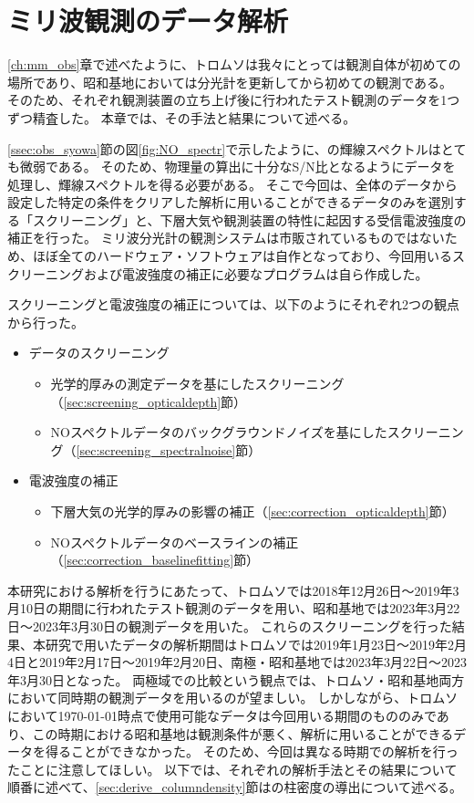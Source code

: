 \chapter{ミリ波観測のデータ解析}
\label{ch:mm_analysis}
\ref{ch:mm_obs}章で述べたように、トロムソは我々にとっては観測自体が初めての場所であり、昭和基地においては分光計を更新してから初めての観測である。
そのため、それぞれ観測装置の立ち上げ後に行われたテスト観測のデータを1つずつ精査した。
本章では、その手法と結果について述べる。\par

\ref{ssec:obs_syowa}節の図\ref{fig:NO_spectr}で示したように、の輝線スペクトルはとても微弱である。
そのため、物理量の算出に十分なS/N比となるようにデータを処理し、輝線スペクトルを得る必要がある。
そこで今回は、全体のデータから設定した特定の条件をクリアした解析に用いることができるデータのみを選別する「スクリーニング」と、下層大気や観測装置の特性に起因する受信電波強度の補正を行った。
ミリ波分光計の観測システムは市販されているものではないため、ほぼ全てのハードウェア・ソフトウェアは自作となっており、今回用いるスクリーニングおよび電波強度の補正に必要なプログラムは自ら作成した。\par

スクリーニングと電波強度の補正については、以下のようにそれぞれ2つの観点から行った。
\begin{itemize}
    \item データのスクリーニング
    \begin{itemize}
        \item 光学的厚みの測定データを基にしたスクリーニング（\ref{sec:screening_opticaldepth}節）
        \item NOスペクトルデータのバックグラウンドノイズを基にしたスクリーニング（\ref{sec:screening_spectralnoise}節）
    \end{itemize}
    \item 電波強度の補正
    \begin{itemize}
        \item 下層大気の光学的厚みの影響の補正（\ref{sec:correction_opticaldepth}節）
        \item NOスペクトルデータのベースラインの補正（\ref{sec:correction_baselinefitting}節）
    \end{itemize}
\end{itemize} \par
本研究における解析を行うにあたって、トロムソでは2018年12月26日〜2019年3月10日の期間に行われたテスト観測のデータを用い、昭和基地では2023年3月22日〜2023年3月30日の観測データを用いた。
これらのスクリーニングを行った結果、本研究で用いたデータの解析期間はトロムソでは2019年1月23日〜2019年2月4日と2019年2月17日〜2019年2月20日、南極・昭和基地では2023年3月22日〜2023年3月30日となった。
両極域での比較という観点では、トロムソ・昭和基地両方において同時期の観測データを用いるのが望ましい。
しかしながら、トロムソにおいて\today 時点で使用可能なデータは今回用いる期間のもののみであり、この時期における昭和基地は観測条件が悪く、解析に用いることができるデータを得ることができなかった。
そのため、今回は異なる時期での解析を行ったことに注意してほしい。
以下では、それぞれの解析手法とその結果について順番に述べて、\ref{sec:derive_columndensity}節はの柱密度の導出について述べる。


